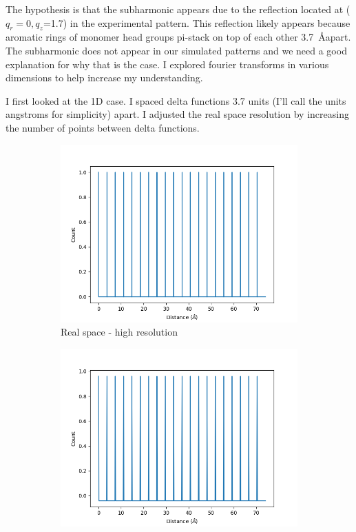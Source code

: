 \documentclass{article}
\begin{document}
The hypothesis is that the subharmonic appears due to the reflection located at
($q_r=0, q_z$=1.7) in the experimental pattern. This reflection likely appears
because aromatic rings of monomer head groups pi-stack on top of each other
3.7~\AA apart. The subharmonic does not appear in our simulated patterns and
we need a good explanation for why that is the case. I explored fourier
transforms in various dimensions to help increase my understanding.
  
I first looked at the 1D case. I spaced delta functions 3.7 units (I'll call
the units angstroms for simplicity) apart. I adjusted the real space resolution
by increasing the number of points between delta functions. 

\begin{figure}[h]
        \begin{subfigure}{0.33\textwidth}
                \centering
                \includegraphics[width=\textwidth]{real_delta_1d_highres.png}
                \caption{Real space - high resolution}\label{fig:real_delta_1d_highres}
        \end{subfigure}
        \begin{subfigure}{0.33\textwidth}
                \centering
                \includegraphics[width=\textwidth]{real_delta_1d_medres.png}

\end{subfigure}
\end{figure}
\end{document}
